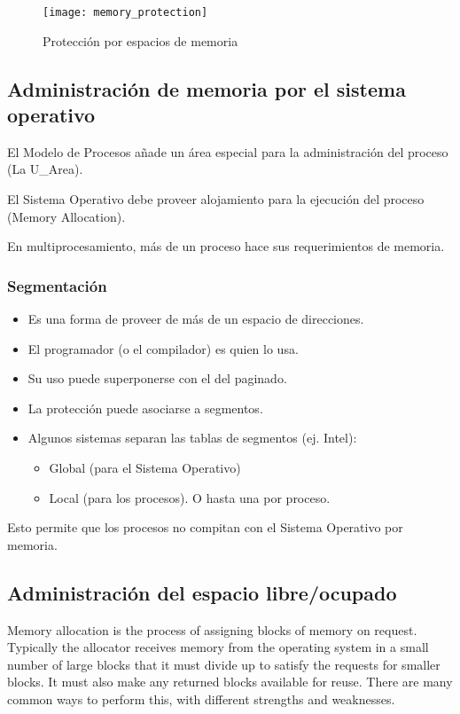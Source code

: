 \documentclass[a4paper, twoside]{article}
\begin{document}
\begin{figure}[h]
  \centering
  \texttt{[image: memory\_protection]}
  \caption{Protección por espacios de memoria}
  \label{fig:memory_protection}
\end{figure}

\newpage
\subsection{Administración de memoria por el sistema operativo}
El Modelo de Procesos añade un área especial para la administración del proceso
(La U\_Area).

El Sistema Operativo debe proveer alojamiento para la ejecución del proceso
(Memory Allocation).

En multiprocesamiento, más de un proceso hace sus requerimientos de memoria.

\subsubsection{Segmentación}

\begin{itemize}
  \item Es una forma de proveer de más de un espacio de direcciones.
  \item El programador (o el compilador) es quien lo usa.
  \item Su uso puede superponerse con el del paginado.
  \item La protección puede asociarse a segmentos.
  \item Algunos sistemas separan las tablas de segmentos (ej. Intel):
  \begin{itemize}
    \item Global (para el Sistema Operativo)
    \item Local (para los procesos). O hasta una por proceso.
  \end{itemize}
\end{itemize}

Esto permite que los procesos no compitan con el Sistema Operativo por memoria.

\subsection{Administración del espacio libre/ocupado}

Memory allocation is the process of assigning blocks of memory on request.
Typically the allocator receives memory from the operating system in a small
number of large blocks that it must divide up to satisfy the requests for
smaller blocks.
It must also make any returned blocks available for reuse.
There are many common ways to perform this, with different strengths and
weaknesses.
\end{document}
